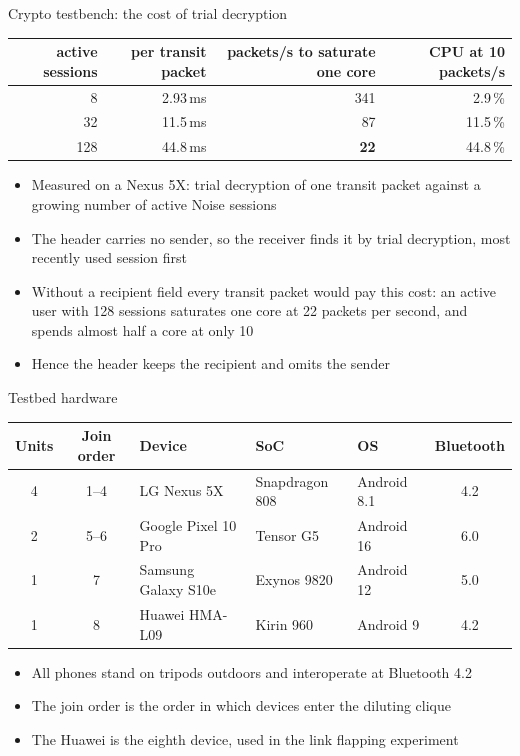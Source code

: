 \begin{frame}{Crypto testbench: the cost of trial decryption}
    \begin{center}
    \begin{tabular}{@{}rrrr@{}}
        \toprule
        active sessions & per transit packet & packets/s to saturate one core & CPU at 10 packets/s \\
        \midrule
        8 & 2.93\,ms & 341 & 2.9\,\% \\
        32 & 11.5\,ms & 87 & 11.5\,\% \\
        128 & 44.8\,ms & \textbf{22} & 44.8\,\% \\
        \bottomrule
    \end{tabular}
    \end{center}
    \vspace{1ex}
    \begin{itemize}
        \item Measured on a Nexus 5X: trial decryption of one transit packet against a growing number of active Noise sessions
        \item The header carries no sender, so the receiver finds it by trial decryption, most recently used session first
        \item Without a recipient field every transit packet would pay this cost: an active user with 128 sessions saturates one core at 22 packets per second, and spends almost half a core at only 10
        \item Hence the header keeps the recipient and omits the sender
    \end{itemize}
\end{frame}

\begin{frame}{Testbed hardware}
    \begin{center}
    \begin{tabular}{@{}cclllc@{}}
        \toprule
        Units & Join order & Device & SoC & OS & Bluetooth \\
        \midrule
        4 & 1--4 & LG Nexus 5X & Snapdragon 808 & Android 8.1 & 4.2 \\
        2 & 5--6 & Google Pixel 10 Pro & Tensor G5 & Android 16 & 6.0 \\
        1 & 7 & Samsung Galaxy S10e & Exynos 9820 & Android 12 & 5.0 \\
        1 & 8 & Huawei HMA-L09 & Kirin 960 & Android 9 & 4.2 \\
        \bottomrule
    \end{tabular}
    \end{center}
    \vspace{1ex}
    \begin{itemize}
        \item All phones stand on tripods outdoors and interoperate at Bluetooth 4.2
        \item The join order is the order in which devices enter the diluting clique
        \item The Huawei is the eighth device, used in the link flapping experiment
    \end{itemize}
\end{frame}

